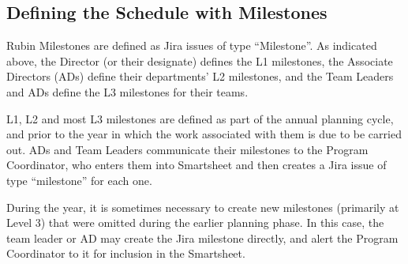 \subsection{Defining the Schedule with Milestones}

Rubin Milestones are defined as Jira issues of type ``Milestone''. As indicated above, the Director (or their designate) defines the L1 milestones, the Associate Directors (ADs) define their departments' L2 milestones, and the Team Leaders and ADs define the L3 milestones for their teams.

L1, L2 and most L3 milestones are defined as part of the annual planning cycle, and prior to the year in which the work associated with them is due to be carried out. ADs and Team Leaders communicate their milestones to the Program Coordinator, who enters them into Smartsheet and then creates a Jira issue of type ``milestone'' for each one.

During the year, it is sometimes necessary to create new milestones (primarily at Level 3) that were omitted during the earlier planning phase. In this case, the team leader or AD may create the Jira milestone directly, and alert the Program Coordinator to it for inclusion in the Smartsheet.

